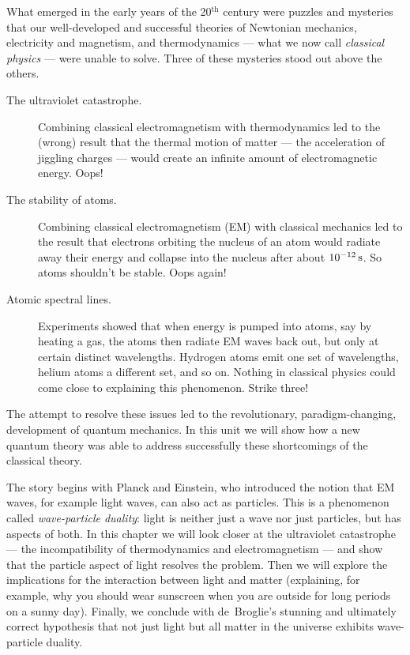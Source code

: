 What emerged in the early years of the 20$^\text{th}$ century were puzzles 
and mysteries that our well-developed and successful theories of Newtonian
mechanics, electricity and magnetism, and thermodynamics --- what we
now call {\it classical physics} --- were unable to solve.  Three of
these mysteries stood out above the others.
\begin{description}
\item[The ultraviolet catastrophe.] Combining classical electromagnetism with
  thermodynamics led to the (wrong) result that the thermal motion of
  matter --- the acceleration of jiggling charges --- would create an
  infinite amount of electromagnetic energy.  Oops!
\item[The stability of atoms.] Combining classical electromagnet\-ism (EM) with
  classical mechanics led to the result that electrons orbiting the
  nucleus of an atom would radiate away their energy and collapse into
  the nucleus after about $10^{-12}\,\mbox{s}$.  So atoms shouldn't be
  stable.  Oops again!
\item[Atomic spectral lines.] Experiments showed that when energy is
  pumped into atoms, say by heating a gas, the atoms then radiate EM
  waves back out, but only at certain distinct wavelengths.  Hydrogen
  atoms emit one set of wavelengths, helium atoms a different set, and
  so on.  Nothing in classical physics could come close to explaining
  this phenomenon.  Strike three!
\end{description}

The attempt to resolve these issues led to the revolutionary,
paradigm-changing, development of quantum mechanics.  In this unit we
will show how a new quantum theory was able to address successfully
these shortcomings of the classical theory.

The story begins with Planck and Einstein, who introduced the notion
that EM waves, for example light waves, can also act as particles.
This is a phenomenon called \textit{wave-particle duality}: light is
neither just a wave nor just particles, but has aspects of both.  In
this chapter we will look closer at the ultraviolet catastrophe ---
the incompatibility of thermodynamics and electromagnetism --- and
show that the particle aspect of light resolves the problem.  Then
we will explore the implications for the interaction between
light and matter (explaining, for example, why you should wear
sunscreen when you are outside for long periods on a sunny day).  
Finally, we conclude with de~Broglie's stunning and
ultimately correct hypothesis that not just light but all matter in
the universe exhibits wave-particle duality.



